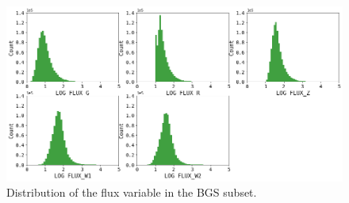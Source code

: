 \begin{figure}[h!]
	\centering
	\includegraphics[width=1\linewidth]{TeX_files/Imagenes/BGS-flux-dist}
	\caption{Distribution of the flux variable in the BGS subset.}
	\label{fig:bgs-flux-dist}
\end{figure}

